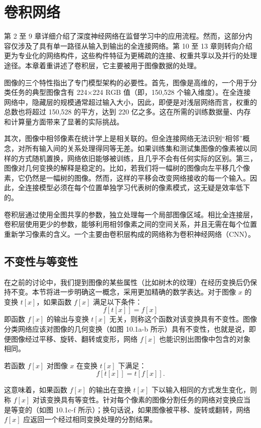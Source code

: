 \chapter{卷积网络}

第 2 至 9 章详细介绍了深度神经网络在监督学习中的应用流程。然而，这部分内容仅涉及了具有单一路径从输入到输出的全连接网络。第 10 至 13 章则转向介绍更为专业化的网络构件，这些构件特征为更稀疏的连接、权重共享以及并行的处理途径。本章着重讲述了卷积层，它主要被用于图像数据的处理。

图像的三个特性指出了专门模型架构的必要性。首先，图像是高维的，一个用于分类任务的典型图像含有 224×224 RGB 值（即，150,528 个输入维度）。在全连接网络中，隐藏层的规模通常超过输入大小，因此，即便是对浅层网络而言，权重的总数也将超过 150,528 的平方，达到 220 亿之多。这在所需的训练数据量、内存和计算量方面带来了显著的实际挑战。

其次，图像中相邻像素在统计学上是相关联的。但全连接网络无法识别“相邻”概念，对所有输入间的关系处理得同等无差。如果训练集和测试集图像的像素被以同样的方式随机置换，网络依旧能够被训练，且几乎不会有任何实际的区别。第三，图像对几何变换的解释是稳定的。比如，若我们将一幅树的图像向左平移几个像素，它仍然是一幅树的图像。然而，这样的平移会改变网络接收的每一个输入。因此，全连接模型必须在每个位置单独学习代表树的像素模式，这无疑是效率低下的。

卷积层通过使用全图共享的参数，独立处理每一个局部图像区域。相比全连接层，卷积层使用更少的参数，能够利用相邻像素之间的空间关系，并且无需在每个位置重新学习像素的含义。一个主要由卷积层构成的网络称为卷积神经网络（CNN）。
\section{不变性与等变性}
在之前的讨论中，我们提到图像的某些属性（比如树木的纹理）在经历变换后仍保持不变。本节将进一步明确这一概念，采用更加精确的数学表达。对于图像 \(x\) 的变换 \(t[x]\)，如果函数 \(f[x]\) 满足以下条件：
\[
f[t[x]] = f[x] \tag{10.1}
\]
即函数 \(f[x]\) 的输出与变换 \(t[x]\) 无关，则称这个函数对该变换具有不变性。图像分类网络应该对图像的几何变换（如图 10.1a-b 所示）具有不变性，也就是说，即便图像经过平移、旋转、翻转或变形，网络 \(f[x]\) 也能识别出图像中包含的对象相同。

若函数 \(f[x]\) 对图像 \(x\) 在变换 \(t[x]\) 下满足：
\[
f[t[x]] = t[f[x]]. \tag{10.2}
\]

这意味着，如果函数 \(f[x]\) 的输出在变换 \(t[x]\) 下以输入相同的方式发生变化，则称 \(f[x]\) 对该变换具有等变性。针对每个像素的图像分割任务的网络对变换应当是等变的（如图 10.1c-f 所示）；换句话说，如果图像被平移、旋转或翻转，网络 \(f[x]\) 应返回一个经过相同变换处理的分割结果。

